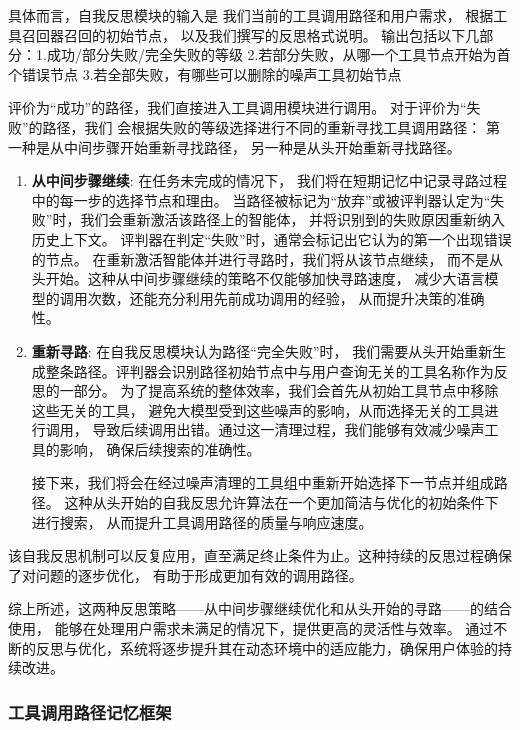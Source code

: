具体而言，自我反思模块的输入是
我们当前的工具调用路径和用户需求，
根据工具召回器召回的初始节点，
以及我们撰写的反思格式说明。
输出包括以下几部分：1.成功/部分失败/完全失败的等级
2.若部分失败，从哪一个工具节点开始为首个错误节点 3.若全部失败，有哪些可以删除的噪声工具初始节点

评价为“成功”的路径，我们直接进入工具调用模块进行调用。
对于评价为“失败”的路径，我们
会根据失败的等级选择进行不同的重新寻找工具调用路径：
第一种是从中间步骤开始重新寻找路径，
另一种是从头开始重新寻找路径。

\begin{enumerate}
  \item \textbf{从中间步骤继续}: 在任务未完成的情况下，
  我们将在短期记忆中记录寻路过程中的每一步的选择节点和理由。
  当路径被标记为“放弃”或被评判器认定为“失败”时，我们会重新激活该路径上的智能体，
  并将识别到的失败原因重新纳入历史上下文。
  评判器在判定“失败”时，通常会标记出它认为的第一个出现错误的节点。
  在重新激活智能体并进行寻路时，我们将从该节点继续，
  而不是从头开始。这种从中间步骤继续的策略不仅能够加快寻路速度，
  减少大语言模型的调用次数，还能充分利用先前成功调用的经验，
  从而提升决策的准确性。
  \item \textbf{重新寻路}: 在自我反思模块认为路径“完全失败”时，
  我们需要从头开始重新生成整条路径。评判器会识别路径初始节点中与用户查询无关的工具名称作为反思的一部分。
  为了提高系统的整体效率，我们会首先从初始工具节点中移除这些无关的工具，
  避免大模型受到这些噪声的影响，从而选择无关的工具进行调用，
  导致后续调用出错。通过这一清理过程，我们能够有效减少噪声工具的影响，
  确保后续搜索的准确性。\par
  接下来，我们将会在经过噪声清理的工具组中重新开始选择下一节点并组成路径。
  这种从头开始的自我反思允许算法在一个更加简洁与优化的初始条件下进行搜索，
  从而提升工具调用路径的质量与响应速度。
\end{enumerate}
 
该自我反思机制可以反复应用，直至满足终止条件为止。这种持续的反思过程确保了对问题的逐步优化，
有助于形成更加有效的调用路径。

综上所述，这两种反思策略——从中间步骤继续优化和从头开始的寻路——的结合使用，
能够在处理用户需求未满足的情况下，提供更高的灵活性与效率。
通过不断的反思与优化，系统将逐步提升其在动态环境中的适应能力，确保用户体验的持续改进。

\subsubsection{工具调用路径记忆框架}

